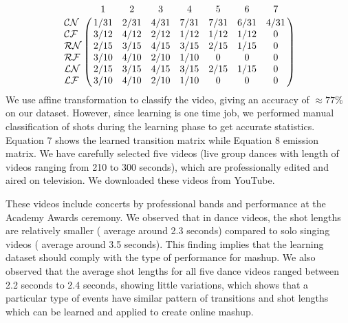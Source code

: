 \documentclass{sig-alternate}
\begin{document}
\begin{equation}
    \bordermatrix{~ & 1 & 2 & 3 & 4 & 5 & 6 & 7 \cr 
        \mathcal{CN} & 1/31 & 2/31 & 4/31 & 7/31 & 7/31 & 6/31 & 4/31 \cr
        \mathcal{CF} & 3/12 & 4/12 & 2/12 & 1/12 & 1/12 & 1/12 & 0 \cr
        \mathcal{RN} & 2/15 & 3/15 & 4/15 & 3/15 & 2/15 & 1/15 & 0 \cr
        \mathcal{RF} & 3/10 & 4/10 & 2/10 & 1/10 & 0 & 0 & 0 \cr
        \mathcal{LN} & 2/15 & 3/15 & 4/15 & 3/15 & 2/15 & 1/15 & 0 \cr
        \mathcal{LF} & 3/10 & 4/10 & 2/10 & 1/10 & 0 & 0 & 0 \cr 
    }
\end{equation}
We use affine transformation to classify the video, giving an accuracy of $\approx 77\%$ on our dataset. However, since learning is one time job, we performed manual classification of shots during the learning phase to get accurate statistics. Equation 7 shows the learned transition matrix while Equation 8 emission matrix. We have carefully selected five videos (live group dances with length of videos ranging from 210 to 300 seconds), which are professionally edited and aired on television. We downloaded these videos from YouTube.

These videos include concerts by professional bands and performance at the Academy Awards ceremony. We observed that in dance videos, the shot lengths are relatively smaller ( average around 2.3 seconds) compared to solo singing videos ( average around 3.5 seconds). This finding implies that the learning dataset should comply with the type of performance for mashup. We also observed that the average shot lengths for all five dance videos ranged between 2.2 seconds to 2.4 seconds, showing little variations, which shows that a particular type of events have similar pattern of transitions and shot lengths which can be learned and applied to create online mashup.
\end{document}
